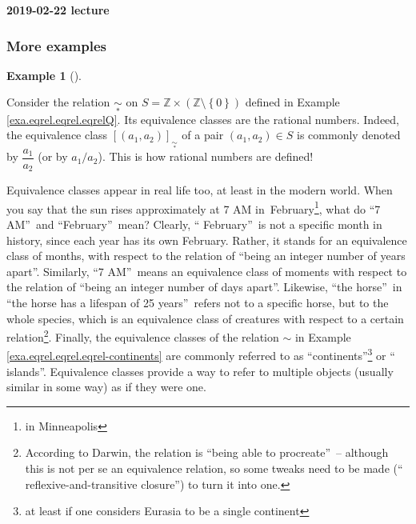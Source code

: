\documentclass[numbers=enddot,12pt,final,onecolumn,notitlepage]{scrartcl}%
\numberwithin{exer}{subsection}
\theoremstyle{definition}
\newtheorem{exam}[theo]{Example}
\newenvironment{example}[1][]
{\begin{exam}[#1]\begin{leftbar}}
{\end{leftbar}\end{exam}}
\begin{document}
\begin{center}
\textbf{2019-02-22 lecture}
\end{center}

\subsubsection{More examples}

\begin{example}
\label{exa.eqrel.eqcl.rat}Consider the relation $\underset{\ast}{\sim}$ on
$S=\mathbb{Z}\times\left(  \mathbb{Z}\setminus\left\{  0\right\}  \right)  $
defined in Example \ref{exa.eqrel.eqrel.eqrelQ}. Its equivalence classes are
the rational numbers. Indeed, the equivalence class $\left[  \left(
a_{1},a_{2}\right)  \right]  _{\underset{\ast}{\sim}}$ of a pair $\left(
a_{1},a_{2}\right)  \in S$ is commonly denoted by $\dfrac{a_{1}}{a_{2}}$ (or
by $a_{1}/a_{2}$). This is how rational numbers are defined!
\end{example}

Equivalence classes appear in real life too, at least in the modern world.
When you say that the sun rises approximately at 7 AM in\ February\footnote{in
Minneapolis}, what do \textquotedblleft7 AM\textquotedblright\ and
\textquotedblleft February\textquotedblright\ mean? Clearly, \textquotedblleft
February\textquotedblright\ is not a specific month in history, since each
year has its own February. Rather, it stands for an equivalence class of
months, with respect to the relation of \textquotedblleft being an integer
number of years apart\textquotedblright. Similarly, \textquotedblleft7
AM\textquotedblright\ means an equivalence class of moments with respect to
the relation of \textquotedblleft being an integer number of days
apart\textquotedblright. Likewise, \textquotedblleft the
horse\textquotedblright\ in \textquotedblleft the horse has a lifespan of 25
years\textquotedblright\ refers not to a specific horse, but to the whole
species, which is an equivalence class of creatures with respect to a certain
relation\footnote{According to Darwin, the relation is \textquotedblleft being
able to procreate\textquotedblright\ -- although this is not per se an
equivalence relation, so some tweaks need to be made (\textquotedblleft
reflexive-and-transitive closure\textquotedblright) to turn it into one.}.
Finally, the equivalence classes of the relation $\sim$ in Example
\ref{exa.eqrel.eqrel.eqrel-continents} are commonly referred to as
\textquotedblleft continents\textquotedblright\footnote{at least if one
considers Eurasia to be a single continent} or \textquotedblleft
islands\textquotedblright. Equivalence classes provide a way to refer to
multiple objects (usually similar in some way) as if they were one.
\end{document}
